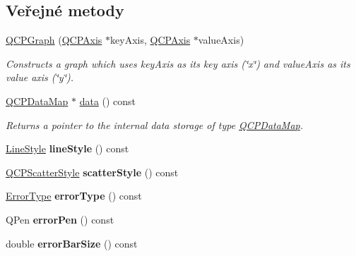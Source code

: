 \subsection*{Veřejné metody}
\begin{DoxyCompactItemize}
\item 
\hyperlink{classQCPGraph_a0393a38cf7183cbf46348eb6cf9a5a6c}{Q\+C\+P\+Graph} (\hyperlink{classQCPAxis}{Q\+C\+P\+Axis} $\ast$key\+Axis, \hyperlink{classQCPAxis}{Q\+C\+P\+Axis} $\ast$value\+Axis)
\begin{DoxyCompactList}\small\item\em Constructs a graph which uses {\itshape key\+Axis} as its key axis (\char`\"{}x\char`\"{}) and {\itshape value\+Axis} as its value axis (\char`\"{}y\char`\"{}). \end{DoxyCompactList}\item 
\hyperlink{qcustomplot_8h_a84a9c4a4c2216ccfdcb5f3067cda76e3}{Q\+C\+P\+Data\+Map} $\ast$ \hyperlink{classQCPGraph_a2f58436df4f86a2792b776a21642b3d9}{data} () const 
\begin{DoxyCompactList}\small\item\em Returns a pointer to the internal data storage of type \hyperlink{qcustomplot_8h_a84a9c4a4c2216ccfdcb5f3067cda76e3}{Q\+C\+P\+Data\+Map}. \end{DoxyCompactList}\item 
\hypertarget{classQCPGraph_ad6db8d31abeac256a285fc68d6b9b9be}{}\hyperlink{classQCPGraph_ad60175cd9b5cac937c5ee685c32c0859}{Line\+Style} {\bfseries line\+Style} () const \label{classQCPGraph_ad6db8d31abeac256a285fc68d6b9b9be}

\item 
\hypertarget{classQCPGraph_ae0227c79f4e42a350c2c99fb2fb879db}{}\hyperlink{classQCPScatterStyle}{Q\+C\+P\+Scatter\+Style} {\bfseries scatter\+Style} () const \label{classQCPGraph_ae0227c79f4e42a350c2c99fb2fb879db}

\item 
\hypertarget{classQCPGraph_a250bcdf78abac87bc6d46ee6fd99a92d}{}\hyperlink{classQCPGraph_ad23b514404bd2cb3216f57c90904d6af}{Error\+Type} {\bfseries error\+Type} () const \label{classQCPGraph_a250bcdf78abac87bc6d46ee6fd99a92d}

\item 
\hypertarget{classQCPGraph_a83455e01093bb899f3b59d4a6fdcd57b}{}Q\+Pen {\bfseries error\+Pen} () const \label{classQCPGraph_a83455e01093bb899f3b59d4a6fdcd57b}

\item 
\hypertarget{classQCPGraph_ae31efdcbc6ba3d73a7aeb83c774f958a}{}double {\bfseries error\+Bar\+Size} () const \label{classQCPGraph_ae31efdcbc6ba3d73a7aeb83c774f958a}


\end{DoxyCompactItemize}
